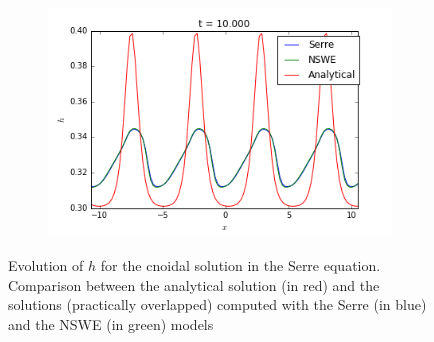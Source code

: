 \begin{figure}[h!]
\begin{subfigure}{.3\linewidth}
	\end{subfigure}
	\begin{subfigure}{.3\linewidth}
		\includegraphics[scale=.3]{figures/Serre/cnoidal3h.png}	
	\end{subfigure}
	\caption{Evolution of $h$ for the cnoidal solution in the Serre equation. Comparison between the analytical solution (in red) and the solutions (practically overlapped) computed with the Serre (in blue) and the NSWE (in green)  models \label{fig:cnoidalh}}
\end{figure}

